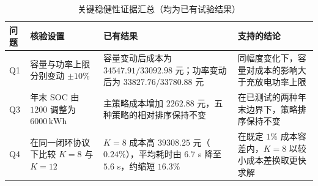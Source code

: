 \begin{table}[htbp]
\centering
\caption{关键稳健性证据汇总（均为已有试验结果）}
\label{tab:robustness-evidence}
\begingroup
\setlength{\tabcolsep}{5pt}
\renewcommand{\arraystretch}{1.28}
\begin{tabularx}{0.98\linewidth}{@{}C{1.0cm}C{3.1cm}YY@{}}
\toprule
问题 & 核验设置 & 已有结果 & 支持的结论 \\
\midrule
Q1 & 容量与功率上限分别变动 $\pm10\%$
& 容量变动后成本为 $34547.91/33092.98$ 元；功率变动后为 $33827.76/33780.88$ 元
& 同幅度变化下，容量对成本的影响大于充放电功率上限 \\
Q3 & 年末 SOC 由 $1200$ 调整为 $6000\,\mathrm{kWh}$
& 主策略成本增加 $2262.88$ 元，五种策略的相对排序保持不变
& 在已测试的两种年末边界下，策略排序保持不变 \\
Q4 & 在同一闭环协议下比较 $K=8$ 与 $K=12$
& $K=8$ 成本高 $39308.25$ 元（$0.24\%$），平均耗时由 $6.7$ s 降至 $5.6$ s，约缩短 $16.3\%$
& 在既定 $1\%$ 成本容差内，$K=8$ 以较小成本差换取更快求解 \\
\bottomrule
\end{tabularx}
\endgroup
\end{table}
